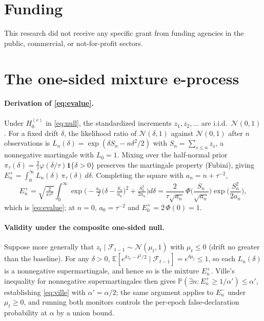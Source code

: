 \documentclass[review,authoryear,12pt]{elsarticle}
\newcommand{\E}{\mathbb{E}}
\newcommand{\Prob}{\mathbb{P}}
\begin{document}
\section*{Funding}
This research did not receive any specific grant from funding agencies in the public, commercial, or not-for-profit sectors.

\appendix

\section{The one-sided mixture e-process}
\label{app:derivation}

\paragraph{Derivation of \eqref{eq:evalue}.} Under $H_0^{(e)}$ in \eqref{eq:null}, the standardized increments $z_1, z_2, \dots$ are i.i.d.\ $\mathcal{N}(0,1)$. For a fixed drift $\delta$, the likelihood ratio of $\mathcal{N}(\delta,1)$ against $\mathcal{N}(0,1)$ after $n$ observations is $L_n(\delta) = \exp(\delta S_n - n\delta^2/2)$ with $S_n = \sum_{s \le n} z_s$, a nonnegative martingale with $L_0 = 1$. Mixing over the half-normal prior $\pi_\tau(\delta) = \frac{2}{\tau}\varphi(\delta/\tau)\mathbf{1}\{\delta > 0\}$ preserves the martingale property (Fubini), giving $E_n^{+} = \int_0^{\infty} L_n(\delta)\, \pi_\tau(\delta)\, d\delta$. Completing the square with $a_n = n + \tau^{-2}$,
\[
E_n^{+}
= \sqrt{\tfrac{2}{\pi\tau^2}} \int_0^{\infty} \exp\!\Big(-\tfrac{a_n}{2}\big(\delta - \tfrac{S_n}{a_n}\big)^2 + \tfrac{S_n^2}{2a_n}\Big) d\delta
= \frac{2}{\tau\sqrt{a_n}}\,\Phi\!\Big(\frac{S_n}{\sqrt{a_n}}\Big)\exp\!\Big(\frac{S_n^2}{2a_n}\Big),
\]
which is \eqref{eq:evalue}; at $n = 0$, $a_0 = \tau^{-2}$ and $E_0^{+} = 2\,\Phi(0) = 1$.

\paragraph{Validity under the composite one-sided null.} Suppose more generally that $z_t \mid \mathcal{F}_{t-1} \sim \mathcal{N}(\mu_t, 1)$ with $\mu_t \le 0$ (drift no greater than the baseline). For any $\delta > 0$, $\E[e^{\delta z_t - \delta^2/2} \mid \mathcal{F}_{t-1}] = e^{\delta \mu_t} \le 1$, so each $L_n(\delta)$ is a nonnegative supermartingale, and hence so is the mixture $E_n^{+}$. Ville's inequality for nonnegative supermartingales then gives $\Prob(\exists n: E_n^{+} \ge 1/\alpha') \le \alpha'$, establishing \eqref{eq:ville} with $\alpha' = \alpha/2$; the same argument applies to $E_n^{-}$ under $\mu_t \ge 0$, and running both monitors controls the per-epoch false-declaration probability at $\alpha$ by a union bound.
\end{document}
